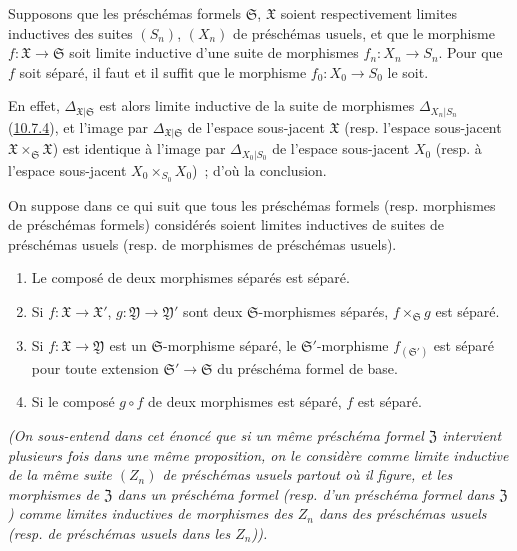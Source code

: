 \begin{proposition}[10.15.2]
\label{I.10.15.2-fr}
Supposons que les préschémas formels $\mathfrak{S}$, $\mathfrak{X}$ soient
respectivement limites inductives des suites $(S_n)$, $(X_n)$ de
préschémas usuels, et que le morphisme
$f:\mathfrak{X}\to\mathfrak{S}$ soit limite inductive d'une suite de
morphismes $f_n:X_n\to S_n$. Pour que $f$ soit séparé, il faut et il suffit
que le morphisme $f_0:X_0\to S_0$ le soit.
\end{proposition}

En effet, $\Delta_{\mathfrak{X}|\mathfrak{S}}$ est alors limite inductive de
la suite de morphismes $\Delta_{X_n|S_n}$
(\hyperref[I.10.7.4-fr]{10.7.4}), et l'image par
$\Delta_{\mathfrak{X}|\mathfrak{S}}$ de l'espace sous-jacent
$\mathfrak{X}$ (resp. l'espace sous-jacent
$\mathfrak{X}\times_{\mathfrak{S}}\mathfrak{X}$) est identique à l'image
par $\Delta_{X_0|S_0}$ de l'espace sous-jacent $X_0$ (resp. à l'espace
sous-jacent $X_0\times_{S_0}X_0$)~; d'où la conclusion.

\begin{proposition}[10.15.3]
\label{I.10.15.3-fr}
On suppose dans ce qui suit que tous les préschémas formels (resp.
morphismes de préschémas formels) considérés soient limites inductives de
suites de préschémas usuels (resp. de morphismes de préschémas usuels).
\begin{enumerate}
  \item[\rm{(i)}] Le composé de deux morphismes séparés est séparé.
  \item[\rm{(ii)}] Si $f:\mathfrak{X}\to\mathfrak{X}'$,
  $g:\mathfrak{Y}\to\mathfrak{Y}'$ sont deux $\mathfrak{S}$-morphismes
  séparés, $f\times_{\mathfrak{S}}g$ est séparé.
  \item[\rm{(iii)}] Si $f:\mathfrak{X}\to\mathfrak{Y}$ est un
  $\mathfrak{S}$-morphisme séparé, le $\mathfrak{S}'$-morphisme
  $f_{(\mathfrak{S}')}$ est séparé pour toute extension
  $\mathfrak{S}'\to\mathfrak{S}$ du préschéma formel de base.
  \item[\rm{(iv)}] Si le composé $g\circ f$ de deux morphismes est séparé,
  $f$ est séparé.
\end{enumerate}
\emph{(On sous-entend dans cet énoncé que si un même préschéma formel
$\mathfrak{Z}$ intervient plusieurs fois dans une même proposition, on le
considère comme limite inductive de la \emph{même} suite $(Z_n)$ de
préschémas usuels partout où il figure, et les morphismes de $\mathfrak{Z}$
dans un préschéma formel (resp. d'un préschéma formel dans $\mathfrak{Z}$)
comme limites inductives de morphismes des $Z_n$ dans des préschémas usuels
(resp. de préschémas usuels dans les $Z_n$)).}
\end{proposition}

